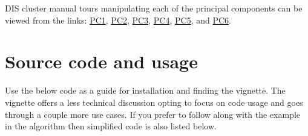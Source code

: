 \documentclass{monashthesis}
\begin{document}
DIS cluster manual tours manipulating each of the principal components can be viewed from the links: \href{https://nspyrison.netlify.com/thesis/discluster_manualtour_pc1/}{PC1}, \href{https://nspyrison.netlify.com/thesis/discluster_manualtour_pc2/}{PC2}, \href{https://nspyrison.netlify.com/thesis/discluster_manualtour_pc3/}{PC3}, \href{https://nspyrison.netlify.com/thesis/discluster_manualtour_pc4/}{PC4}, \href{https://nspyrison.netlify.com/thesis/discluster_manualtour_pc5/}{PC5}, and \href{https://nspyrison.netlify.com/thesis/discluster_manualtour_pc6/}{PC6}.

\hypertarget{sec:usage}{%
\section{Source code and usage}\label{sec:usage}}

Use the below code as a guide for installation and finding the vignette. The vignette offers a less technical discussion opting to focus on code usage and goes through a couple more use cases. If you prefer to follow along with the example in the algorithm then simplified code is also listed below.
\end{document}

